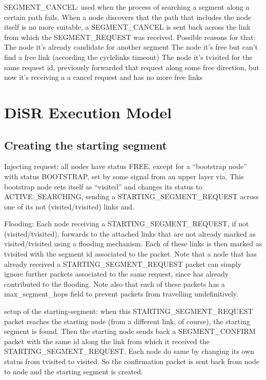 \documentclass[conference]{IEEEtran}
\begin{document}
SEGMENT\_CANCEL: used when the process of searching a segment along a
certain path fails. When a node discovers that the path that includes
the node itself is no more suitable, a SEGMENT\_CANCEL is sent back
across the link from which the SEGMENT\_REQUEST was received.  Possible
reasons for that: The node it’s already candidate for another segment
The node it’s free but can’t find a free link (according the
cyclelinks timeout) The node it’s tvisited for the same request id,
previously forwarded that request along some free direction, but now
it’s receiving a a cancel request and has no more free links

\section{DiSR Execution Model}

\subsection{Creating the starting segment}

Injecting request: all nodes have status FREE, except for a
“bootstrap node” with status BOOTSTRAP, set by some signal from an
upper layer via. This bootstrap node sets itself as “visited” and
changes its status to ACTIVE\_SEARCHING, sending a
STARTING\_SEGMENT\_REQUEST across one of its not (visited/tvisited)
links and.  

Flooding: Each node receiving a STARTING\_SEGMENT\_REQUEST,
if not (visited/tvisited),  forwards  to the attached links that are
not already marked as visited/tvisited using a flooding mechanism.
Each of these links is then marked as tvisited with the segment id
associated to the packet. Note that a node that has already received a
STARTING\_SEGMENT\_REQUEST packet can simply ignore further packets
associated to the same request, since has already contributed to the
flooding. Note also that each of these packets has a max\_segment\_hops
field to prevent packets from travelling undefinitively.  

setup of the starting-segment: when this STARTING\_SEGMENT\_REQUEST packet reaches
the starting node (from a different link, of course), the starting
segment is found. Then the starting node sends back a SEGMENT\_CONFIRM
packet with the same id along the link from which it received the
STARTING\_SEGMENT\_REQUEST. Each node do same by changing its own status
from tvisited to visited. So the confirmation packet is sent back from
node to node and the starting segment is created. 
\end{document}
